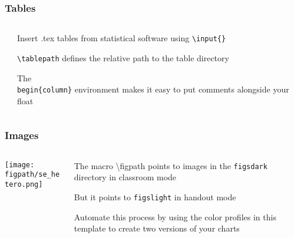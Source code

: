 \documentclass[aspectratio=169,handout]{beamer}
\begin{document}
	

\begin{frame}
	\frametitle{Tables}
	\begin{columns}[T] %
	\begin{column}{.48\textwidth}
		
	\end{column}%
	\hfill%
	\begin{column}{.48\textwidth}
		\begin{witem}
		\item Insert .tex tables from statistical software 
			using \texttt{\textbackslash{}input\{\}}
		\item \texttt{\textbackslash{}tablepath} defines the relative path to
			the table directory
		\item The \texttt{\\begin\{column\}} environment
			makes it easy to put comments alongside your float
	\end{witem}
	\end{column}%
	\end{columns}
\end{frame}


\begin{frame}
	\frametitle{Images}
	\begin{columns}[T] %
	\begin{column}{.48\textwidth}
		\texttt{[image: \\figpath/se\_hetero.png]}
	\end{column}%
	\hfill%
	\begin{column}{.48\textwidth}
		\begin{witem}
		\item The macro {\textbackslash{}figpath} points to images in the
			\texttt{figs\textunderscore{}dark} directory in classroom mode
		\item But it points to \texttt{figs\textunderscore{}light} in handout mode
		\item Automate this process by using the color profiles in this template
			to create two versions of your charts
	\end{witem}
	\end{column}%
	\end{columns}
\end{frame}
	
\end{document}
